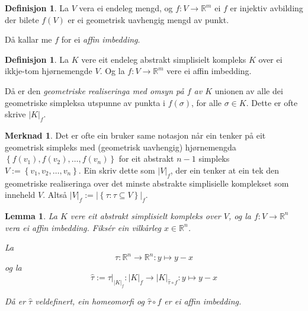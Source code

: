 \documentclass[a4paper, 12pt, norsk]{article}
\theoremstyle{plain}
\newtheorem{lemma}[theorem]{Lemma}
\theoremstyle{definition}
\newtheorem{definition}[theorem]{Definisjon}
\newtheorem{remark}[theorem]{Merknad}
\newcommand{\Rb}{\mathbb{R}}
\newcommand{\gr}[1]{ \lvert #1 \rvert } %
\newcommand{\set}[1]{ \left\{ #1 \right\} } %
\begin{document}
\begin{definition}
	La $V$ vera ei endeleg mengd, og $f:V\rightarrow \Rb^m$ ei $f$ er injektiv avbilding der bilete $f(V)$ er ei geometrisk uavhengig mengd av punkt. 
	
	Då kallar me \( f \) for ei \emph{affin imbedding}.
\end{definition}

\begin{definition} \label{def:gr}
	La \( K \) vere eit endeleg abstrakt simplisielt kompleks $K$ over ei ikkje-tom hjørnemengde $V$. Og la $f:V\to\Rb^m$ vere ei affin imbedding.
	
	Då er den \emph{geometriske realiseringa med omsyn på $f$ av \( K \)} unionen av alle dei geometriske simpleksa utspunne av punkta i $f(\sigma)$, for alle $\sigma\in K$. Dette er ofte skrive $\gr{K}_f$.
\end{definition}

\begin{remark} \label{rem:gr-SK}
	Det er ofte ein bruker same notasjon når ein tenker på eit geometrisk simpleks med (geometrisk uavhengig) hjørnemengda \( \set{f(v_1), f(v_2), \dots, f(v_n)} \) for eit abstrakt \( n-1 \) simpleks \( V := \set{v_1, v_2, \dots, v_n} \). Ein skriv dette som \( \gr{V}_f \), der ein tenker at ein tek den geometriske realiseringa over det minste abstrakte simplisielle komplekset som inneheld \( V \). Altså \( \gr{V}_f := \gr{\set{\tau : \tau \subseteq V}}_f \).
\end{remark}

\begin{lemma} \label{thm:tau-homeomorfi}
	La \( K \) vere eit abstrakt simplisielt kompleks over \( V \), og la \( f: V \to \Rb^n \) vera ei affin imbedding. Fiksér ein vilkårleg \( x \in \Rb^n \).
	
	La
	\[
		\tau: \Rb^n \to \Rb^n : y \mapsto y - x
	\]
	og la
	\[ 
		\hat{\tau} := \tau|_{\gr{K}_f}: \gr{K}_f \to \gr{K}_{\hat{\tau} \circ f} : y \mapsto y - x
	\]

	Då er \( \hat{\tau} \) veldefinert, ein homeomorfi og \( \hat{\tau} \circ f \) er ei affin imbedding.
\end{lemma}
\end{document}
